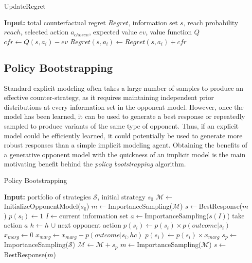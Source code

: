 \documentclass{aamas2013}
\begin{document}
    \begin{algorithm}
    \caption{UpdateRegret}
    \label{alg-tdcfr-updateregret}
    \begin{algorithmic}[1]
    \STATE \textbf{Input:} total counterfactual regret $Regret$, information set $s$, reach probability $reach$, selected action $a_{chosen}$, expected value $ev$, value function $Q$
        \STATE $cfr \leftarrow Q(s,a_{i}) - ev$
        \STATE $Regret(s,a_{i}) \leftarrow Regret(s,a_{i}) + cfr$
    \ENDFOR
    \end{algorithmic}
    \end{algorithm}

    \subsection{Policy Bootstrapping}
    Standard explicit modeling often takes a large number of samples to produce an effective counter-strategy, as it requires maintaining independent prior distributions at every information set in the opponent model. However, once the model has been learned, it can be used to generate a best response or repeatedly sampled to produce variants of the same type of opponent. Thus, if an explicit model could be efficiently learned, it could potentially be used to generate more robust responses than a simple implicit modeling agent. Obtaining the benefits of a generative opponent model with the quickness of an implicit model is the main motivating benefit behind the \textit{policy bootstrapping} algorithm.

    \begin{algorithm}
    \caption{Policy Bootstrapping}
    \label{alg-policybootstrapping}
    \begin{algorithmic}[1]
    \STATE \textbf{Input:} portfolio of strategies $\mathcal{S}$, initial strategy $s_0$
    \STATE $\mathcal{M} \leftarrow$InitializeOpponentModel($s_0$)
    \STATE $m \leftarrow$ImportanceSampling($\mathcal{M}$)
    \STATE $s \leftarrow$BestResponse($m$)
        \STATE $p(s_i) \leftarrow 1$
    \ENDFOR
    \LOOP
            \STATE $I \leftarrow$current information set
            \STATE $a \leftarrow$ImportanceSampling($s(I)$)
            \STATE take action $a$
            \STATE $h \leftarrow h$ $\cup $ next opponent action
        \ENDWHILE
              \STATE $p(s_i) \leftarrow p(s_i) \times p(outcome | s_i)$
            \ENDFOR
        \ELSE
              \STATE $x_{marg} \leftarrow 0$
                \STATE $x_{marg} \leftarrow x_{marg} + p(outcome | s_i, hc)$
              \ENDFOR
              \STATE $p(s_i) \leftarrow p(s_i) \times x_{marg}$
            \ENDFOR
        \ENDIF
        \STATE $s_p \leftarrow$ImportanceSampling($\mathcal{S}$)
        \STATE $\mathcal{M} \leftarrow \mathcal{M} + s_p$
        \STATE $m \leftarrow$ImportanceSampling($\mathcal{M}$)
        \STATE $s \leftarrow$BestResponse($m$)
    \ENDLOOP
    \end{algorithmic}
    \end{algorithm}
\end{document}
